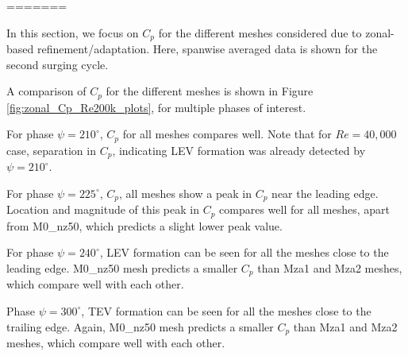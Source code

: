 =======

In this section, we focus on $C_p$ for the different meshes considered due to zonal-based refinement/adaptation.
Here, spanwise averaged data is shown for the second surging cycle.

A comparison of $C_p$ for the different meshes is shown in Figure \ref{fig:zonal_Cp_Re200k_plots}, for multiple phases of interest. 


For phase $\psi=210^\circ$, $C_p$ for all meshes compares well. Note that for $Re=40,000$ case, separation in $C_p$, indicating LEV formation was already detected by $\psi=210^\circ$. 

For phase $\psi=225^\circ$, $C_p$, all meshes show a peak in $C_p$ near the leading edge.
Location and magnitude of this peak in $C_p$ compares well for all meshes, apart from M0\_nz50, which predicts a slight lower peak value. 

For phase $\psi=240^\circ$, LEV formation can be seen for all the meshes close to the leading edge.
M0\_nz50 mesh predicts a smaller $C_p$ than Mza1 and Mza2 meshes, which compare well with each other.

Phase $\psi=300^\circ$, TEV formation can be seen for all the meshes close to the trailing edge.
Again, M0\_nz50 mesh predicts a smaller $C_p$ than Mza1 and Mza2 meshes, which compare well with each other.


